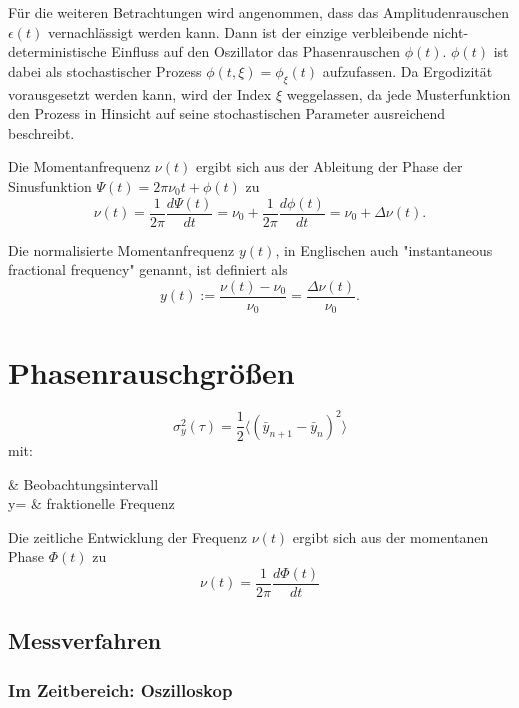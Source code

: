 Für die weiteren Betrachtungen wird angenommen, dass das Amplitudenrauschen $\epsilon(t)$ vernachlässigt werden kann. Dann ist der einzige verbleibende nicht-deterministische Einfluss auf den Oszillator das Phasenrauschen $\phi(t)$. $\phi(t)$ ist dabei als stochastischer Prozess $\phi(t,\xi)=\phi_\xi(t)$ aufzufassen. Da Ergodizität vorausgesetzt werden kann, wird der Index $\xi$ weggelassen, da jede Musterfunktion den Prozess in Hinsicht auf seine stochastischen Parameter ausreichend beschreibt.

Die Momentanfrequenz $\nu(t)$ ergibt sich aus der Ableitung der Phase der Sinusfunktion $\Psi(t)=2\pi \nu_0 t + \phi(t)$ zu
\begin{equation}
	\nu(t)=\frac{1}{2\pi} \frac{d\Psi(t)}{dt} = \nu_0 + \frac{1}{2\pi} \frac{d\phi(t)}{dt} = \nu_0 + \Delta\nu(t).
\end{equation}

Die normalisierte Momentanfrequenz $y(t)$, in Englischen auch "instantaneous fractional frequency" genannt, ist definiert als
\begin{equation}
	y(t):=\frac{\nu(t)-\nu_0}{\nu_0} = \frac{\Delta\nu(t)}{\nu_0}.
\end{equation}


\section{Phasenrauschgrößen}

\begin{equation}
	\sigma_y^2(\tau)=\frac{1}{2} \Big\langle(\bar{y}_{n+1}-\bar{y}_{n})^2\Big\rangle
\end{equation}
mit:
\begin{with*}
	\tau & Beobachtungsintervall \\
	y= & fraktionelle Frequenz \\
\end{with*}

Die zeitliche Entwicklung der Frequenz $\nu(t)$ ergibt sich aus der momentanen Phase $\Phi(t)$ zu 
\begin{equation}
	\nu(t)=\frac{1}{2\pi} \frac{d\Phi(t)}{dt}
\end{equation}


\subsection{Messverfahren}

\subsubsection{Im Zeitbereich: Oszilloskop}


